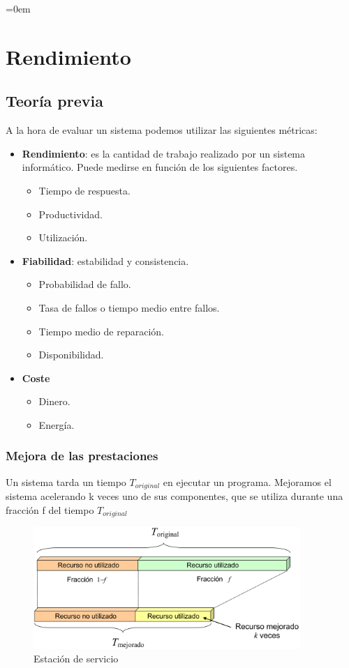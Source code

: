 \parindent=0em
\chapter{Rendimiento}

\section{Teoría previa}
A la hora de evaluar un sistema podemos utilizar las siguientes métricas:
\begin{itemize}
    \item \textbf{Rendimiento}: es la cantidad de trabajo realizado por un sistema informático. Puede medirse en función de los siguientes factores.
    \begin{itemize}
        \item Tiempo de respuesta.
        \item Productividad.
        \item Utilización.
    \end{itemize}
    \item \textbf{Fiabilidad}: estabilidad y consistencia.
    \begin{itemize}
        \item Probabilidad de fallo.
        \item Tasa de fallos o tiempo medio entre fallos.
        \item Tiempo medio de reparación.
        \item Disponibilidad.
    \end{itemize}
    \item \textbf{Coste}
    \begin{itemize}
        \item Dinero.
        \item Energía.
    \end{itemize}
\end{itemize}
\subsection{Mejora de las prestaciones}
Un sistema tarda un tiempo $T_{original}$ en ejecutar un programa. Mejoramos el sistema acelerando k veces uno de sus componentes,
que se utiliza durante una fracción f del tiempo $T_{original}$
\begin{figure}[H]
    \centering
    \includegraphics[width=0.9\textwidth]{Images/Mejora.png}
    \caption{Estación de servicio}
\end{figure}
